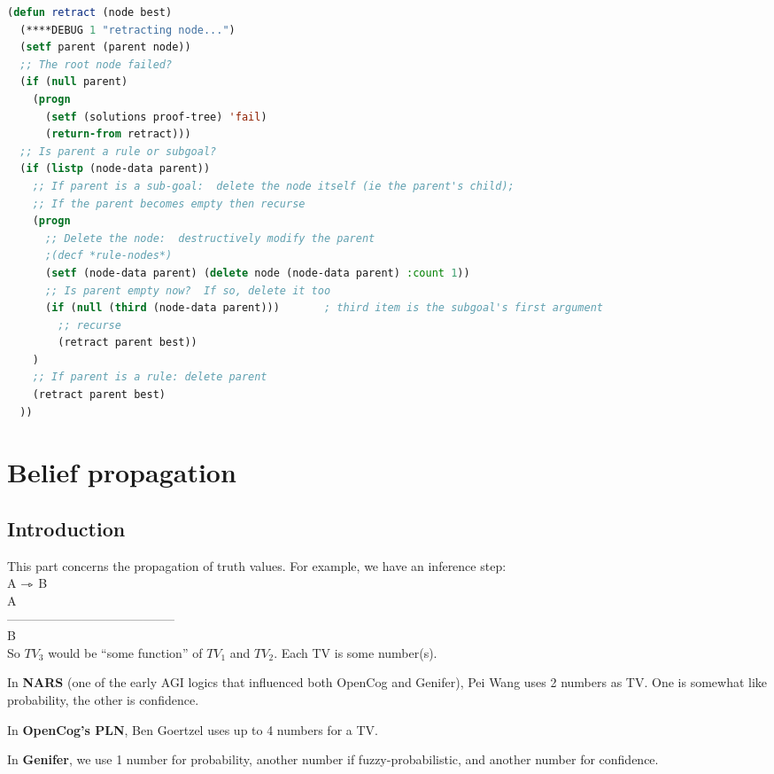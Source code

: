 \begin{lstlisting}[language=Lisp]
(defun retract (node best)
  (****DEBUG 1 "retracting node...")
  (setf parent (parent node))
  ;; The root node failed?
  (if (null parent)
    (progn
      (setf (solutions proof-tree) 'fail)
      (return-from retract)))
  ;; Is parent a rule or subgoal?
  (if (listp (node-data parent))
    ;; If parent is a sub-goal:  delete the node itself (ie the parent's child);
    ;; If the parent becomes empty then recurse
    (progn
      ;; Delete the node:  destructively modify the parent
      ;(decf *rule-nodes*)
      (setf (node-data parent) (delete node (node-data parent) :count 1))
      ;; Is parent empty now?  If so, delete it too
      (if (null (third (node-data parent)))       ; third item is the subgoal's first argument
        ;; recurse
        (retract parent best))
    )
    ;; If parent is a rule: delete parent
    (retract parent best)
  ))
\end{lstlisting}

\section{Belief propagation}

\subsection{Introduction}

This part concerns the propagation of truth values.  For example, we
have an inference step:\\
\tab A $\rightarrowtriangle$ B    \tab {} \\
\tab A              \tab\tab {} \\
\tab -----------------------------------------  \\
\tab B              \tab\tab {} \\
So $TV_3$ would be ``some function'' of $TV_1$ and $TV_2$.  Each TV is some number(s).

In \textbf{NARS} (one of the early AGI logics that influenced both OpenCog and Genifer), Pei Wang
uses 2 numbers as TV.  One is somewhat like probability, the other is confidence.

In \textbf{OpenCog's PLN}, Ben Goertzel uses up to 4 numbers for a TV.

In \textbf{Genifer}, we use 1 number for probability, another number if fuzzy-probabilistic, and
another number for confidence.

